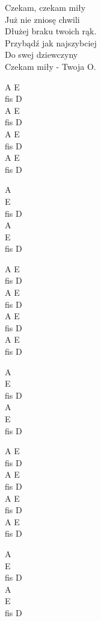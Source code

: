 \begin{text}
    \vin Czekam, czekam miły\\
    \vin Już nie zniosę chwili\\
    \vin Dłużej braku twoich rąk.\\
    \vin Przybądź jak najszybciej\\
    \vin Do swej dziewczyny\\
    \vin Czekam miły - Twoja O.

 
\end{text}
\begin{chord}
    A E\\
    fis D\\
    A E\\
    fis D\\
    A E\\
    fis D\\
    A E\\
    fis D

    A\\
    E\\
    fis D\\
    A\\
    E\\
    fis D

    A E\\
    fis D\\
    A E\\
    fis D\\
    A E\\
    fis D\\
    A E\\
    fis D

    A\\
    E\\
    fis D\\
    A\\
    E\\
    fis D

    A E\\
    fis D\\
    A E\\
    fis D\\
    A E\\
    fis D\\
    A E\\
    fis D

    A\\
    E\\
    fis D\\
    A\\
    E\\
    fis D
\end{chord}